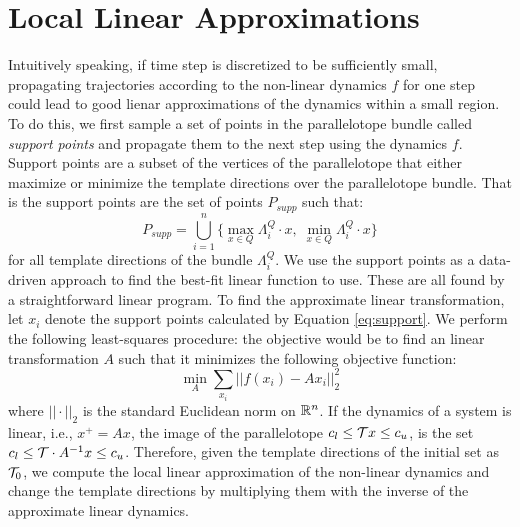 \section{Local Linear Approximations}
\label{sec:lin_app}
%
Intuitively speaking, if time step is discretized to be sufficiently small, propagating trajectories according to the non-linear dynamics $f$ for one step could lead to good lienar approximations of the dynamics within a small region.
%
%
To do this, we first sample a set of points in the parallelotope bundle called \emph{support points} and propagate them to the next step using the dynamics $f$.
%
Support points are a subset of the vertices of the parallelotope that either maximize or minimize the template directions over the parallelotope bundle.
%
That is the support points are the set of points $P_{supp}$ such that:
\begin{equation}
\label{eq:support}
 P_{supp} = \bigcup_{i=1}^n \{ \max_{x \in Q} \Lambda^Q_i\cdot x, \; \min_{x \in Q} \Lambda^Q_i\cdot x \}
\end{equation}
%
for all template directions of the bundle $\Lambda^Q_i$. We use the support points as a data-driven approach to find the best-fit linear function to use. These are all found by a straightforward linear program.
%
%
To find the approximate linear transformation, let $x_i$ denote the support points calculated by Equation \ref{eq:support}. We perform the following least-squares procedure: the objective would be to find an linear transformation $A$ such that it minimizes the following objective function:
\begin{equation}
  \label{eq:least_squares}
  \min_{A} \sum_{x_i} ||f(x_i) - Ax_i||^2_2
\end{equation}
%
where $||\cdot||_2$ is the standard Euclidean norm on ${\mathbb{R}}^n$.
%
If the dynamics of a system is linear, i.e., $x^{+} = Ax$, the image of the parallelotope $c_{l} \leq \mathcal{T} x \leq c_{u}$, is the set $c_{l} \leq \mathcal{T} \cdot A^{-1} x \leq c_{u}$.
%
Therefore, given the template directions of the initial set as $\mathcal{T}_0$, we compute the local linear approximation of the non-linear dynamics and change the template directions by multiplying them with the inverse of the approximate linear dynamics.
%


